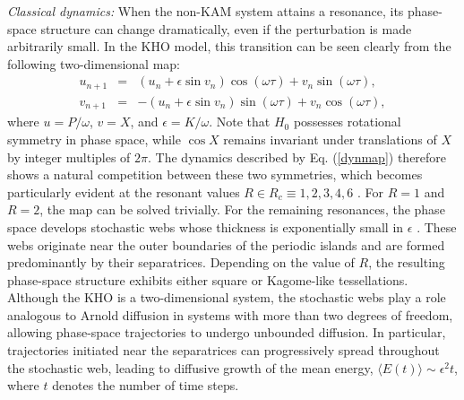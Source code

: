 \documentclass[amsmath,nobibnotes,aps,amssymb,pra, prl,aps,showpacs,superscriptaddress,twocolumn, longbibliography, reprint]{revtex4-2}
\begin{document}
\textit{Classical dynamics: }When the non-KAM system attains a resonance, its phase-space structure can change dramatically, even if the perturbation is made arbitrarily small. In the KHO model, this transition can be seen clearly from the following two-dimensional map:
\begin{eqnarray}\label{dynmap}
u_{n+1} &=&(u_n+\epsilon\sin v_n)\cos(\omega\tau) +v_n \sin(\omega\tau),\nonumber\\
v_{n+1} &=&-(u_n+\epsilon\sin v_n)\sin(\omega\tau) +v_n \cos(\omega\tau),
\end{eqnarray}
where $u=P/\omega$, $v=X$, and $\epsilon=K/\omega$. 
Note that $H_0$ possesses rotational symmetry in phase space, while $\cos X$ remains invariant under translations of $X$ by integer multiples of $2\pi$. The dynamics described by Eq. (\ref{dynmap}) therefore shows a natural competition between these two symmetries, which becomes particularly evident at the resonant values $R\in R_c\equiv{1,2,3,4,6}$ \cite{chernikov1989symmetry,afanasiev1990width}. For $R=1$ and $R=2$, the map can be solved trivially. For the remaining resonances, the phase space develops stochastic webs whose thickness is exponentially small in $\epsilon$ \cite{afanasiev1990width}. These webs originate near the outer boundaries of the periodic islands and are formed predominantly by their separatrices. Depending on the value of $R$, the resulting phase-space structure exhibits either square or Kagome-like tessellations. Although the KHO is a two-dimensional system, the stochastic webs play a role analogous to Arnold diffusion in systems with more than two degrees of freedom, allowing phase-space trajectories to undergo unbounded diffusion. In particular, trajectories initiated near the separatrices can progressively spread throughout the stochastic web, leading to diffusive growth of the mean energy, $\langle E(t)\rangle\sim\epsilon^2t$, where $t$ denotes the number of time steps.
\end{document}
